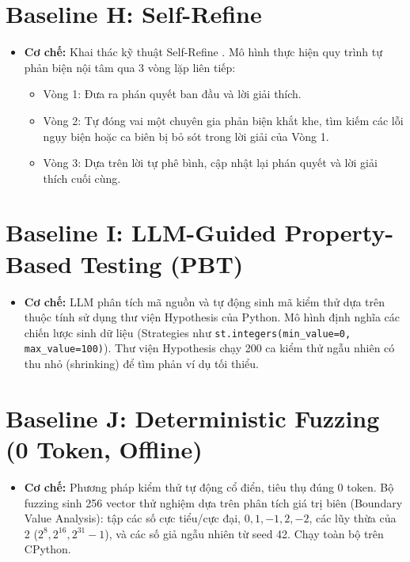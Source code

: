 \section{Baseline H: Self-Refine}
\begin{itemize}
    \item \textbf{Cơ chế:} Khai thác kỹ thuật Self-Refine \cite{madaan2024self}. Mô hình thực hiện quy trình tự phản biện nội tâm qua 3 vòng lặp liên tiếp:
    \begin{itemize}
        \item Vòng 1: Đưa ra phán quyết ban đầu và lời giải thích.
        \item Vòng 2: Tự đóng vai một chuyên gia phản biện khắt khe, tìm kiếm các lỗi ngụy biện hoặc ca biên bị bỏ sót trong lời giải của Vòng 1.
        \item Vòng 3: Dựa trên lời tự phê bình, cập nhật lại phán quyết và lời giải thích cuối cùng.
    \end{itemize}
\end{itemize}

\section{Baseline I: LLM-Guided Property-Based Testing (PBT)}
\begin{itemize}
    \item \textbf{Cơ chế:} LLM phân tích mã nguồn và tự động sinh mã kiểm thử dựa trên thuộc tính sử dụng thư viện Hypothesis của Python. Mô hình định nghĩa các chiến lược sinh dữ liệu (Strategies như \texttt{st.integers(min\_value=0, max\_value=100)}). Thư viện Hypothesis chạy 200 ca kiểm thử ngẫu nhiên có thu nhỏ (shrinking) để tìm phản ví dụ tối thiểu.
\end{itemize}

\section{Baseline J: Deterministic Fuzzing (0 Token, Offline)}
\begin{itemize}
    \item \textbf{Cơ chế:} Phương pháp kiểm thử tự động cổ điển, tiêu thụ đúng 0 token. Bộ fuzzing sinh 256 vector thử nghiệm dựa trên phân tích giá trị biên (Boundary Value Analysis): tập các số cực tiểu/cực đại, $0, 1, -1, 2, -2$, các lũy thừa của 2 ($2^8, 2^{16}, 2^{31}-1$), và các số giả ngẫu nhiên từ seed 42. Chạy toàn bộ trên CPython.
\end{itemize}

